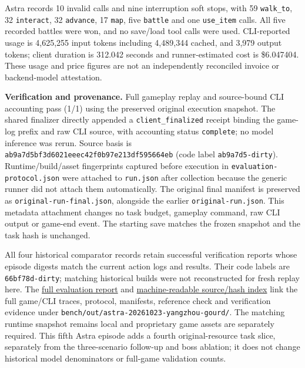 \documentclass[11pt,a4paper]{article}
\begin{document}
Astra records 10 invalid calls and nine interruption soft stops, with 59 \texttt{walk\allowbreak{}\_\allowbreak{}to}, 32 \texttt{interact}, 32 \texttt{advance}, 17 \texttt{map}, five \texttt{battle} and one \texttt{use\allowbreak{}\_\allowbreak{}item} calls. All five recorded battles were won, and no save/load tool calls were used. CLI-reported usage is 4,625,255 input tokens including 4,489,344 cached, and 3,979 output tokens; client duration is 312.042 seconds and runner-estimated cost is \$6.047404. These usage and price figures are not an independently reconciled invoice or backend-model attestation.

\textbf{Verification and provenance.} Full gameplay replay and source-bound CLI accounting pass (1/1) using the preserved original execution snapshot. The shared finalizer directly appended a \texttt{client\allowbreak{}\_\allowbreak{}finalized} receipt binding the game-log prefix and raw CLI source, with accounting status \texttt{complete}; no model inference was rerun. Source basis is \texttt{ab9a7d5b\allowbreak{}f3d6021e\allowbreak{}eec42f0b\allowbreak{}97e213df\allowbreak{}595664eb} (code label \texttt{ab9a7d5\allowbreak{}-\allowbreak{}dirty}). Runtime/build/asset fingerprints captured before execution in \texttt{evaluation\allowbreak{}-\allowbreak{}protocol\allowbreak{}.\allowbreak{}json} were attached to \texttt{run\allowbreak{}.\allowbreak{}json} after collection because the generic runner did not attach them automatically. The original final manifest is preserved as \texttt{original\allowbreak{}-\allowbreak{}run\allowbreak{}-\allowbreak{}final\allowbreak{}.\allowbreak{}json}, alongside the earlier \texttt{original\allowbreak{}-\allowbreak{}run\allowbreak{}.\allowbreak{}json}. This metadata attachment changes no task budget, gameplay command, raw CLI output or game-end event. The starting save matches the frozen snapshot and the task hash is unchanged.

All four historical comparator records retain successful verification reports whose episode digests match the current action logs and results. Their code labels are \texttt{66bf78d\allowbreak{}-\allowbreak{}dirty}; matching historical builds were not reconstructed for fresh replay here. The \href{astra-yangzhou-gourd-2026-10-23.md}{full evaluation report} and \href{astra-yangzhou-gourd-2026-10-23.evidence.json}{machine-readable source/hash index} link the full game/CLI traces, protocol, manifests, reference check and verification evidence under \texttt{bench\allowbreak{}/\allowbreak{}out\allowbreak{}/\allowbreak{}astra\allowbreak{}-\allowbreak{}20261023\allowbreak{}-\allowbreak{}yangzhou\allowbreak{}-\allowbreak{}gourd\allowbreak{}/}. The matching runtime snapshot remains local and proprietary game assets are separately required. This fifth Astra episode adds a fourth original-resource task slice, separately from the three-scenario follow-up and boss ablation; it does not change historical model denominators or full-game validation counts.
\end{document}
